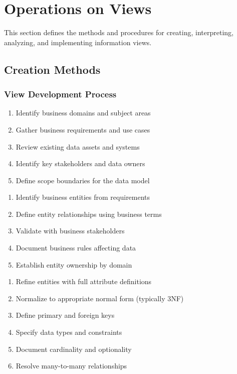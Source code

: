 \documentclass[11pt,letterpaper]{article}
\begin{document}
\section{Operations on Views}

This section defines the methods and procedures for creating, interpreting, analyzing, and implementing information views.

\subsection{Creation Methods}

\subsubsection{View Development Process}

\begin{guidancebox}
\begin{enumerate}[nosep]
    \item Identify business domains and subject areas
    \item Gather business requirements and use cases
    \item Review existing data assets and systems
    \item Identify key stakeholders and data owners
    \item Define scope boundaries for the data model
\end{enumerate}
\end{guidancebox}

\begin{guidancebox}
\begin{enumerate}[nosep]
    \item Identify business entities from requirements
    \item Define entity relationships using business terms
    \item Validate with business stakeholders
    \item Document business rules affecting data
    \item Establish entity ownership by domain
\end{enumerate}
\end{guidancebox}

\begin{guidancebox}
\begin{enumerate}[nosep]
    \item Refine entities with full attribute definitions
    \item Normalize to appropriate normal form (typically 3NF)
    \item Define primary and foreign keys
    \item Specify data types and constraints
    \item Document cardinality and optionality
    \item Resolve many-to-many relationships
\end{enumerate}
\end{guidancebox}
\end{document}
